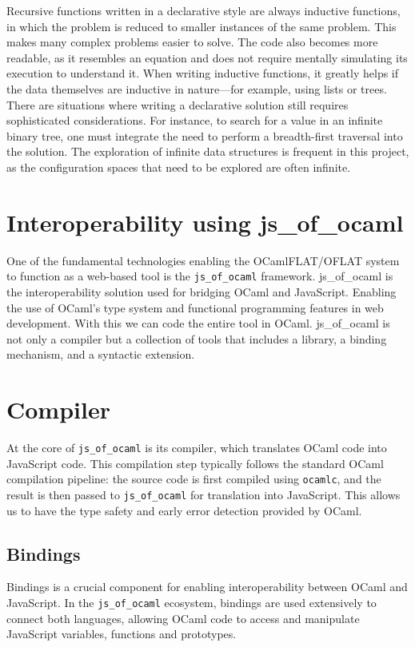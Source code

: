 Recursive functions written in a declarative style are always inductive functions, in which the problem is reduced to smaller instances of the same problem. 
This makes many complex problems easier to solve. The code also becomes more readable, as it resembles an equation and does not require mentally simulating its execution to understand it. 
When writing inductive functions, it greatly helps if the data themselves are inductive in nature—for example, using lists or trees.
There are situations where writing a declarative solution still requires sophisticated considerations. 
For instance, to search for a value in an infinite binary tree, one must integrate the need to perform a breadth-first traversal into the solution. 
The exploration of infinite data structures is frequent in this project, as the configuration spaces that need to be explored are often infinite.


\section{Interoperability using js\_of\_ocaml}

One of the fundamental technologies enabling the OCamlFLAT/OFLAT system to function as a web-based tool is the \texttt{js\_of\_ocaml} framework. 
js\_of\_ocaml\cite{js-of-ocaml-manual} is the interoperability solution used for bridging OCaml and JavaScript. 
Enabling the use of OCaml's type system and functional programming features in web development.
With this we can code the entire tool in OCaml.
js\_of\_ocaml is not only a compiler but a collection of tools that includes a library, a binding mechanism, and a syntactic extension.

\section*{Compiler}

At the core of \texttt{js\_of\_ocaml} is its compiler, which translates OCaml code into JavaScript code. 
This compilation step typically follows the standard OCaml compilation pipeline: 
the source code is first compiled using \texttt{ocamlc}, and the result is then passed to \texttt{js\_of\_ocaml} for translation into JavaScript.
This allows us to have the type safety and early error detection provided by OCaml.

\subsection{Bindings}
Bindings is a crucial component for enabling interoperability between OCaml and JavaScript. 
In the \texttt{js\_of\_ocaml} ecosystem, bindings are used extensively to connect both languages, 
allowing OCaml code to access and manipulate JavaScript variables, functions and prototypes.

